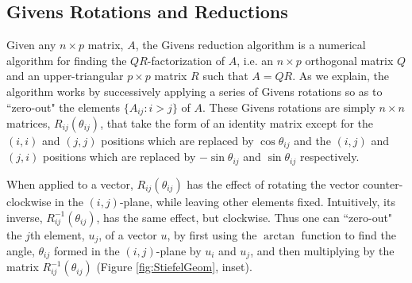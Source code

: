 \documentclass[ba]{imsart}
\numberwithin{equation}{section}
\theoremstyle{plain}
\begin{document}
\subsection{Givens Rotations and Reductions} \label{givens_reduction}
Given any $n \times p$ matrix, $A$, the Givens reduction algorithm is a numerical algorithm for finding the $QR$-factorization of $A$, i.e. an $n\times p$ orthogonal matrix $Q$ and an upper-triangular $p \times p$ matrix $R$ such that $A = QR$. As we explain, the algorithm works by successively applying a series of Givens rotations so as to ``zero-out" the elements $\{A_{ij} : i > j \}$ of $A$. These Givens rotations are simply $n \times n$ matrices, $R_{ij}(\theta_{ij})$, that take the form of an identity matrix except for the $(i,i)$ and $(j,j)$ positions which are replaced by $\cos \theta_{ij}$ and the $(i,j)$ and $(j,i)$ positions which are replaced by $-\sin \theta_{ij}$ and $\sin \theta_{ij}$ respectively.

\noindent When applied to a vector, $R_{ij}(\theta_{ij})$ has the effect of rotating the vector counter-clockwise in the $(i,j)$-plane, while leaving other elements fixed. Intuitively, its inverse, $R_{ij}^{-1}(\theta_{ij})$, has the same effect, but clockwise. Thus one can ``zero-out" the $j$th element, $u_j$, of a vector $u$, by first using the $\arctan$ function to find the angle, $\theta_{ij}$ formed in the $(i,j)$-plane by $u_i$ and $u_j$, and then multiplying by the matrix $R_{ij}^{-1}(\theta_{ij})$ (Figure \ref{fig:StiefelGeom}, inset).

\end{document}
